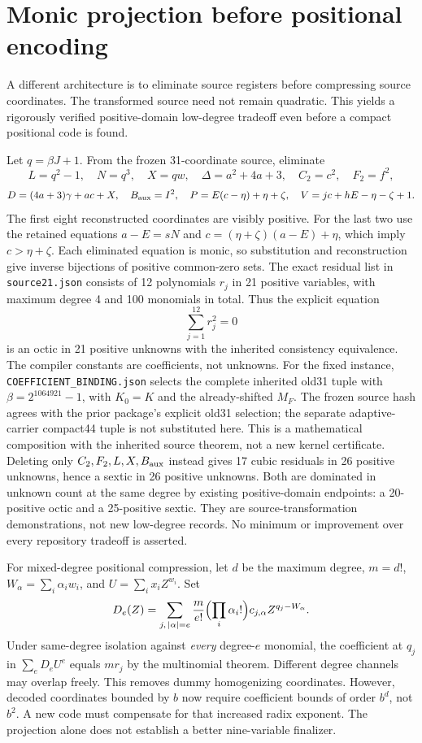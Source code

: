 \section{Monic projection before positional encoding}
A different architecture is to eliminate source registers before compressing
source coordinates.  The transformed source need not remain quadratic.
This yields a rigorously verified positive-domain low-degree tradeoff even
before a compact positional code is found.

Let $q=\beta J+1$.  From the frozen 31-coordinate source, eliminate
\[
 L=q^2-1,\quad N=q^3,\quad X=qw,\quad
 \Delta=a^2+4a+3,\quad C_2=c^2,\quad F_2=f^2,
\]
\[
 D=(4a+3)\gamma+ac+X,\quad B_{\rm aux}=I^2,
 \quad P=E(c-\eta)+\eta+\zeta,
 \quad V=jc+hE-\eta-\zeta+1.
\]
The first eight reconstructed coordinates are visibly positive. For the last
two use the retained equations $a-E=sN$ and
$c=(\eta+\zeta)(a-E)+\eta$, which imply $c>\eta+\zeta$.
Each eliminated equation is monic, so substitution and reconstruction give
inverse bijections of positive common-zero sets.
The exact residual list in \texttt{source21.json} consists of 12 polynomials
$r_j$ in 21 positive variables, with maximum degree 4 and 100 monomials in total.
Thus the explicit equation
\[
                  \sum_{j=1}^{12}r_j^2=0
\]
is an octic in 21 positive unknowns with the inherited consistency equivalence.
The compiler constants are coefficients, not unknowns. For the fixed instance,
\texttt{COEFFICIENT\_BINDING.json} selects the complete inherited old31 tuple
with $\beta=2^{1064921}-1$, with $K_0=K$ and the already-shifted $M_F$.
The frozen source hash agrees with the prior package's explicit old31 selection;
the separate adaptive-carrier compact44 tuple is not substituted here. This is a mathematical
composition with the inherited source theorem, not a new kernel certificate.
Deleting only $C_2,F_2,L,X,B_{\rm aux}$ instead gives 17 cubic residuals in 26
positive unknowns, hence a sextic in 26 positive unknowns.
Both are dominated in unknown count at the same degree by existing
positive-domain endpoints: a 20-positive octic and a 25-positive sextic.
They are source-transformation demonstrations, not new low-degree records.
No minimum or improvement over every repository tradeoff is asserted.

For mixed-degree positional compression, let $d$ be the maximum degree,
$m=d!$, $W_\alpha=\sum_i\alpha_iw_i$, and $U=\sum_i x_iZ^{w_i}$. Set
\[
 D_e(Z)=\sum_{j,\,|\alpha|=e}
 \frac{m}{e!}\Bigl(\prod_i\alpha_i!\Bigr)c_{j,\alpha}
 Z^{q_j-W_\alpha}.
\]
Under same-degree isolation against \emph{every} degree-$e$ monomial,
the coefficient at $q_j$ in $\sum_eD_eU^e$ equals $mr_j$ by the multinomial
theorem. Different degree channels may overlap freely. This removes dummy
homogenizing coordinates. However, decoded coordinates bounded by $b$ now
require coefficient bounds of order $b^d$, not$b^2$. A new code must compensate
for that increased radix exponent. The projection alone does not establish
a better nine-variable finalizer.

